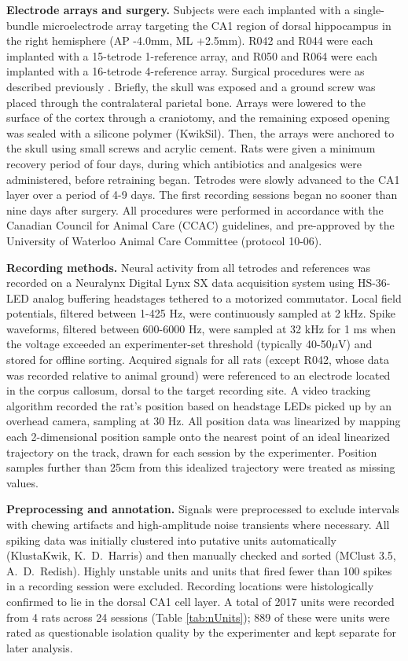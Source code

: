 \documentclass[11pt]{article}
\let\cite=\citep
\begin{document}
{\bf Electrode arrays and surgery.} Subjects were each implanted with
a single-bundle microelectrode array targeting the CA1 region of
dorsal hippocampus in the right hemisphere (AP -4.0mm, ML
+2.5mm). R042 and R044 were each implanted with a 15-tetrode
1-reference array, and R050 and R064 were each implanted with a
16-tetrode 4-reference array. Surgical procedures were as described
previously \cite{Malhotra2015}. Briefly, the skull was exposed and a
ground screw was placed through the contralateral parietal
bone. Arrays were lowered to the surface of the cortex through a
craniotomy, and the remaining exposed opening was sealed with a
silicone polymer (KwikSil). Then, the arrays were anchored to the
skull using small screws and acrylic cement. Rats were given a minimum
recovery period of four days, during which antibiotics and analgesics
were administered, before retraining began. Tetrodes were slowly
advanced to the CA1 layer over a period of 4-9 days. The first
recording sessions began no sooner than nine days after surgery. All
procedures were performed in accordance with the Canadian Council for
Animal Care (CCAC) guidelines, and pre-approved by the University of
Waterloo Animal Care Committee (protocol 10-06).

{\bf Recording methods.} Neural activity from all tetrodes and
references was recorded on a Neuralynx Digital Lynx SX data
acquisition system using HS-36-LED analog buffering headstages
tethered to a motorized commutator. Local field potentials, filtered
between 1-425 Hz, were continuously sampled at 2 kHz. Spike waveforms,
filtered between 600-6000 Hz, were sampled at 32 kHz for 1 ms when the
voltage exceeded an experimenter-set threshold (typically 40-50$\mu$V)
and stored for offline sorting. Acquired signals for all rats (except
R042, whose data was recorded relative to animal ground) were
referenced to an electrode located in the corpus callosum, dorsal to
the target recording site. A video tracking algorithm recorded the
rat's position based on headstage LEDs picked up by an overhead
camera, sampling at 30 Hz. All position data was linearized by mapping
each 2-dimensional position sample onto the nearest point of an ideal
linearized trajectory on the track, drawn for each session by the
experimenter. Position samples further than 25cm from this idealized
trajectory were treated as missing values.

{\bf Preprocessing and annotation.} Signals were preprocessed to
exclude intervals with chewing artifacts and high-amplitude noise
transients where necessary. All spiking data was initially clustered
into putative units automatically (KlustaKwik, K.\ D.\ Harris) and
then manually checked and sorted (MClust 3.5, A.\ D.\ Redish). Highly
unstable units and units that fired fewer than 100 spikes in a
recording session were excluded. Recording locations were
histologically confirmed to lie in the dorsal CA1 cell layer. A total
of 2017 units were recorded from 4 rats across 24 sessions (Table
\ref{tab:nUnits}); 889 of these were units were rated as questionable
isolation quality by the experimenter and kept separate for later
analysis.
\end{document}
